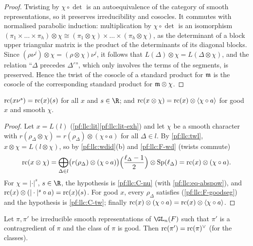 \begin{proof}
Twisting by $\chi\circ\det$ is an autoequivalence of the category of smooth representations, so it preserves
irreducibility and cosocles. It commutes with normalised parabolic induction: multiplication by $\chi\circ\det$ is an
isomorphism $(\pi_1\times\dots\times\pi_h)\otimes\chi\cong(\pi_1\otimes\chi)\times\dots\times(\pi_h\otimes\chi)$, as the
determinant of a block upper triangular matrix is the product of the determinants of its diagonal blocks. Since
$(\rho\nu^j)\otimes\chi=(\rho\otimes\chi)\nu^j$, it follows that $L(\Delta)\otimes\chi=L(\Delta\otimes\chi)$, and the relation
``$\Delta$ precedes $\Delta'$'', which only involves the terms of the segments, is preserved. Hence the twist of the
cosocle of a standard product for $\mathfrak m$ is the cosocle of the corresponding standard product for $\mathfrak m\otimes\chi$.
\end{proof}

\begin{proposition}[Twists]\label{pf:llc:exttw}
$\mathrm{rc}(x\nu^s)=\mathrm{rc}(x)(s)$ for all $x$ and $s\in\R$; and $\mathrm{rc}(x\otimes\chi)=\mathrm{rc}(x)\otimes\langle\chi\circ a\rangle$ for good $x$
and smooth $\chi$. 
\end{proposition}

\begin{proof}
Let $x=L(l)$ (\cref{pf:llc:lit}\ref{pf:llc:lit-exh}) and let $\chi$ be a smooth character with
$r(\rho_\Delta\otimes\chi)=r(\rho_\Delta)\otimes(\chi\circ a)$ for all $\Delta\in l$. By \cref{pf:llc:twl}, $x\otimes\chi=L(l\otimes\chi)$, so by
\cref{pf:llc:wdid}(b) and \ref{pf:llc:F-wd} (twists commute)
\[
  \mathrm{rc}(x\otimes\chi)=\bigoplus_{\Delta\in l}\bigl(r(\rho_\Delta)\otimes(\chi\circ a)\bigr)\Bigl(\frac{\ell_\Delta-1}2\Bigr)\otimes\operatorname{Sp}(\ell_\Delta)
  =\mathrm{rc}(x)\otimes(\chi\circ a).
\]
For $\chi=|\cdot|^s$, $s\in\R$, the hypothesis is \ref{pf:llc:C-nu} (with \eqref{pf:llc:eq-abspow}), and
$\mathrm{rc}(x)\otimes(|\cdot|^s\circ a)=\mathrm{rc}(x)(s)$. For good $x$, every $\rho_\Delta$ satisfies \llcGo{} (\ref{pf:llc:F-goodseg})
and the hypothesis is \ref{pf:llc:C-tw}; finally $\mathrm{rc}(x)\otimes(\chi\circ a)=\mathrm{rc}(x)\otimes\langle\chi\circ a\rangle$.
\end{proof}

\begin{proposition}[Contragredients]\label{pf:llc:extdual}
Let $\pi,\pi'$ be irreducible smooth representations of $\GL_n(F)$ such that $\pi'$ is a contragredient of $\pi$ and the class
of $\pi$ is good. Then $\mathrm{rc}(\pi')=\mathrm{rc}(\pi)^\vee$ (for the classes). 
\end{proposition}

